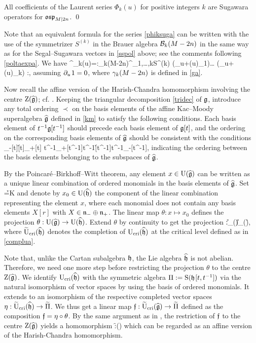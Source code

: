 \documentclass[12pt]{article}
\begin{document}
\bpr\label{prop:suga}
All coefficients of the Laurent series
$\Phi^{}_{k}(u)$ for positive integers $k$
are Sugawara operators for $\mathfrak{osp}_{M|2n}$.
\qed
\epr

Note that an equivalent formula for the series \eqref{phiksuga} can be written
with the use of the symmetrizer $S^{(k)}$ in the Brauer algebra ${\mathcal B}_k(M-2n)$
in the same way as
for the Segal--Sugawara vectors in \eqref{sspol} above; see the comments
following \eqref{poltaexpa}.
We have
\Phi^{}_{k}(u)=\ts :\tss\ga_k(M-2n)\ts\str^{}_{1,\dots,k}\tss S^{(k)} \big(\di_u+\hF(u)_{1}\big)\dots
\big(\di_u+\hF(u)_{k}\big) :\ts,
\eeq
assuming $\partial_u\hspace{1pt} 1=0$, where $\gamma_k(M-2n)$ is defined in \eqref{ga}.

Now recall the affine version of the Harish-Chandra homomorphism
involving the centre ${\rm Z}(\widehat{\mathfrak{g}})$; cf. \cite[Sec.~13.3]{m:so}.
Keeping the triangular decomposition
\eqref{tridec} of $\mathfrak{g}$, introduce any total ordering $\prec$ on the basis elements of the
affine Kac--Moody superalgebra $\widehat{\mathfrak{g}}$ defined in
\eqref{km} to satisfy the following conditions.
Each basis element of $t^{-1}\mathfrak{g}[t^{-1}]$ should precede each basis element
of $\mathfrak{g}[t]$, and
the ordering on the corresponding basis elements of $\widehat{\mathfrak{g}}$ should be consistent with
the conditions
\ben
\n_-[t]\prec \h[t]\prec \n_+[t]\Fand
t^{-1}\tss\n_+[t^{-1}]\prec t^{-1}\tss\h[t^{-1}]\prec t^{-1}\tss\n_-[t^{-1}],
\een
indicating the ordering between the basis elements belonging to the subspaces of $\widehat{\mathfrak{g}}$.

By the Poincar\'e--Birkhoff--Witt theorem,
any element $x\in{\rm U}(\widehat{\mathfrak{g}})$
can be written as a unique linear combination of
ordered monomials
in the basis elements of $\widehat{\mathfrak{g}}$.
Set
\ben
\wh\h=\h\tss[t,t^{-1}]\oplus\CC K
\een
and denote by $x_0\in {\rm U}(\widehat{\mathfrak h})$ the component
of the linear combination representing the element $x$,
where each
monomial does not
contain any basis elements $X[r]$ with $X\in\mathfrak n_-\oplus\mathfrak n_+$.
The linear map $\theta:x\mapsto x_0$ defines the projection
$\theta:{\rm U}(\widehat{\mathfrak{g}})\to {\rm U}(\widehat{\mathfrak h})$.
Extend $\theta$
by continuity to get the projection
\ben
\theta:\wt\U_{\cri}(\wh\g)\to \wt\U_{\cri}(\wh\h),
\een
where $\widetilde{{\rm U}}_{{\rm cri}}(\widehat{\mathfrak h})$ denotes the completion
of ${\rm U}_{{\rm cri}}(\widehat{\mathfrak h})$ at the critical level defined as in \eqref{complua}.

Note that, unlike the Cartan subalgebra $\mathfrak h$, the Lie algebra $\widehat{\mathfrak h}$ is not abelian.
Therefore, we need one more step before restricting the projection $\theta$ to the centre ${\rm Z}(\widehat{\mathfrak{g}})$.
We identify ${\rm U}_{{\rm cri}}(\widehat{\mathfrak h})$ with the symmetric algebra
$\Pi:={\rm S}(\mathfrak h\hspace{1pt}[t,t^{-1}])$ via
the natural isomorphism of vector spaces by using the basis of
ordered monomials. It extends to an isomorphism of the respective completed
vector spaces
$
\eta:\widetilde{{\rm U}}_{{\rm cri}}(\widehat{\mathfrak h})\to \widetilde\Pi$.
We thus get a linear map
$
\mathfrak{f}:\widetilde{{\rm U}}_{{\rm cri}}(\widehat{\mathfrak{g}})\to \widetilde\Pi
$
defined as the composition $\mathfrak{f}=\eta\circ\theta$. By the same argument as in \cite[Prop.~13.3.1]{m:so},
the restriction of $\mathfrak{f}$ to the centre ${\rm Z}(\widehat{\mathfrak{g}})$ yields a homomorphism
\f:\Z(\wh\g)\to \wt\Pi
\eeq
which can be regarded as an affine version of the
Harish-Chandra homomorphism.
\end{document}
